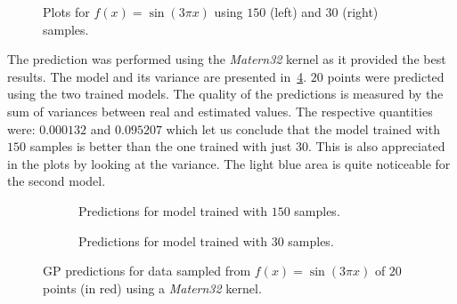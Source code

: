 \begin{figure}
  \centering
  
  \caption{Plots for $f(x) = \sin(3\pi x)$ using $150$ (left) and $30$ (right)
  samples.}
  \label{fig_gpsamples}
\end{figure}

The prediction was performed using the \emph{Matern32} kernel as it provided the
best results. The model and its variance are presented
in~\cref{fig_gppredftest}. $20$ points were predicted using the two trained
models. The quality of the predictions is measured by the sum of variances
between real and estimated values. The respective quantities were: $0.000132$
and $0.095207$ which let us conclude that the model trained with $150$ samples
is better than the one trained with just $30$. This is also appreciated in the
plots by looking at the variance. The light blue area is quite noticeable for
the second model.

\begin{figure}
  \begin{subfigure}[h]{.5\linewidth}
    
    \caption{Predictions for model trained with $150$ samples.}
    \label{fig_predftest}
  \end{subfigure}
  \begin{subfigure}[h]{.5\linewidth}
    
    \caption{Predictions for model trained with $30$ samples.}
    \label{fig_predftest2}
  \end{subfigure}
  \caption{GP predictions for data sampled from $f(x) = \sin(3\pi x)$ of $20$
   points (in red) using a \emph{Matern32} kernel.}
  \label{fig_gppredftest}
\end{figure}
